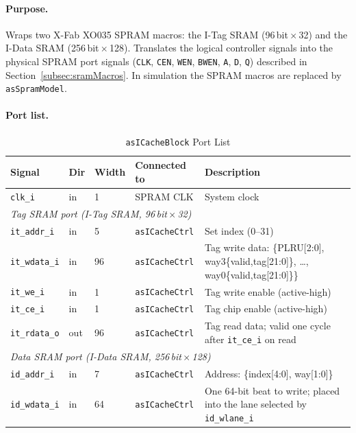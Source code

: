 \paragraph{Purpose.}
Wraps two X-Fab XO035 SPRAM macros: the I-Tag SRAM (96\,bit\,$\times$\,32)
and the I-Data SRAM (256\,bit\,$\times$\,128).
Translates the logical controller signals into the physical SPRAM port
signals (\texttt{CLK}, \texttt{CEN}, \texttt{WEN}, \texttt{BWEN},
\texttt{A}, \texttt{D}, \texttt{Q}) described in
Section~\ref{subsec:sramMacros}.
In simulation the SPRAM macros are replaced by \texttt{asSpramModel}.

\paragraph{Port list.}

\begin{table}[H]
\caption{\texttt{asICacheBlock} Port List}
\label{tab:asICacheBlockPorts}
\centering
\begin{tabularx}{\textwidth}{|l |l |l |l |X|}
  \hline
  Signal & Dir & Width & Connected to & Description \\
  \hline
  \hline
  \texttt{clk\_i}         & in  & 1   & SPRAM CLK         & System clock \\
  \hline
  \multicolumn{5}{|l|}{\textit{Tag SRAM port (I-Tag SRAM, 96\,bit\,$\times$\,32)}} \\
  \hline
  \texttt{it\_addr\_i}    & in  & 5   & \texttt{asICacheCtrl} & Set index (0--31) \\
  \hline
  \texttt{it\_wdata\_i}   & in  & 96  & \texttt{asICacheCtrl} & Tag write data: \{PLRU[2:0], way3\{valid,tag[21:0]\}, \ldots, way0\{valid,tag[21:0]\}\} \\
  \hline
  \texttt{it\_we\_i}      & in  & 1   & \texttt{asICacheCtrl} & Tag write enable (active-high) \\
  \hline
  \texttt{it\_ce\_i}      & in  & 1   & \texttt{asICacheCtrl} & Tag chip enable (active-high) \\
  \hline
  \texttt{it\_rdata\_o}   & out & 96  & \texttt{asICacheCtrl} & Tag read data; valid one cycle after \texttt{it\_ce\_i} on read \\
  \hline
  \multicolumn{5}{|l|}{\textit{Data SRAM port (I-Data SRAM, 256\,bit\,$\times$\,128)}} \\
  \hline
  \texttt{id\_addr\_i}    & in  & 7   & \texttt{asICacheCtrl} & Address: \{index[4:0], way[1:0]\} \\
  \hline
  \texttt{id\_wdata\_i}   & in  & 64  & \texttt{asICacheCtrl} & One 64-bit beat to write; placed into the lane selected by \texttt{id\_wlane\_i} \\

\end{tabularx}
\end{table}
